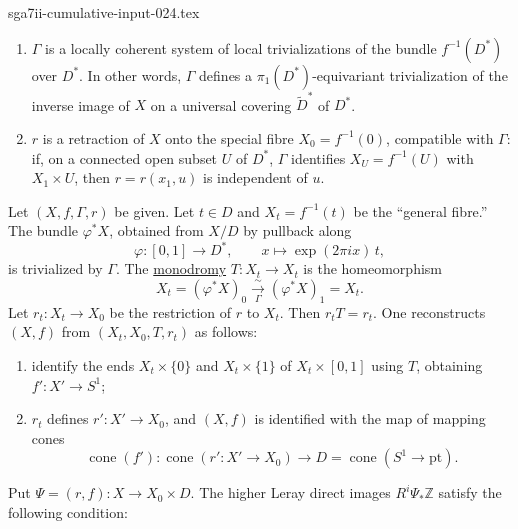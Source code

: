 \begin{filecontents*}{sga7ii-cumulative-input-024.tex}
\begin{enumerate}[label=(\alph*),leftmargin=2.6em]
\item $\Gamma$ is a locally coherent system of local trivializations of
the bundle $f^{-1}(D^*)$ over $D^*$.  In other words, $\Gamma$ defines a
$\pi_1(D^*)$-equivariant trivialization of the inverse image of $X$ on a
universal covering $\widetilde D^*$ of $D^*$.

\item $r$ is a retraction of $X$ onto the special fibre
$X_0=f^{-1}(0)$, compatible with $\Gamma$: if, on a connected open
subset $U$ of $D^*$, $\Gamma$ identifies
$X_U=f^{-1}(U)$ with $X_1\times U$, then $r=r(x_1,u)$ is independent of
$u$.
\end{enumerate}

Let $(X,f,\Gamma,r)$ be given.  Let $t\in D$ and
$X_t=f^{-1}(t)$ be the ``general fibre.''  The bundle $\varphi^*X$,
obtained from $X/D$ by pullback along
\begin{equation*}
\varphi:[0,1]\longrightarrow D^*,
\qquad x\longmapsto \exp(2\pi i x)\,t,
\end{equation*}
is trivialized by $\Gamma$.  The \underline{monodromy}
$T:X_t\longrightarrow X_t$ is the homeomorphism
\begin{equation*}
X_t=(\varphi^*X)_0\xrightarrow[\Gamma]{\sim}
(\varphi^*X)_1=X_t.
\end{equation*}
Let $r_t:X_t\longrightarrow X_0$ be the restriction of $r$ to $X_t$.
Then $r_tT=r_t$.  One reconstructs $(X,f)$ from
$(X_t,X_0,T,r_t)$ as follows:
\begin{enumerate}[label=(\alph*),leftmargin=2.6em]
\item identify the ends $X_t\times\{0\}$ and $X_t\times\{1\}$ of
$X_t\times[0,1]$ using $T$, obtaining $f':X'\longrightarrow S^1$;
\item $r_t$ defines $r':X'\longrightarrow X_0$, and $(X,f)$ is
identified with the map of mapping cones
\begin{equation*}
\operatorname{cone}(f'):
\operatorname{cone}(r':X'\longrightarrow X_0)
\longrightarrow D=\operatorname{cone}(S^1\longrightarrow\mathrm{pt}).
\end{equation*}
\end{enumerate}


Put $\Psi=(r,f):X\longrightarrow X_0\times D$.  The higher Leray direct
images $R^i\Psi_*\mathbb Z$ satisfy the following condition:


\end{filecontents*}

